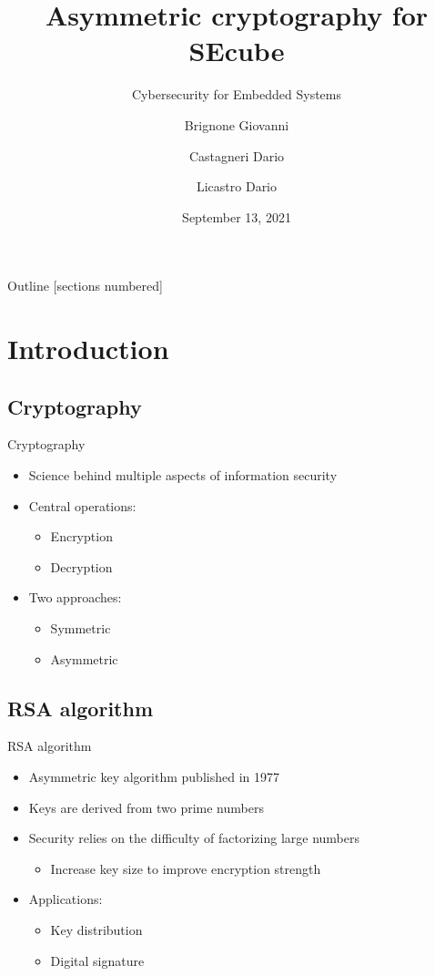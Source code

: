 \documentclass[aspectratio=169]{beamer}
\title{Asymmetric cryptography for SEcube}
\subtitle{Cybersecurity for Embedded Systems}
\author{Brignone Giovanni \and Castagneri Dario \and Licastro Dario}
\institute{Politecnico di Torino}
\date{September 13, 2021}
\begin{document}
\begin{frame}
	\maketitle
\end{frame}

\begin{frame}{Outline}
	[sections numbered]
	\tableofcontents[hideallsubsections]
\end{frame}

\section{Introduction}

\subsection{Cryptography}
\begin{frame}{Cryptography}
	\begin{itemize}
		\item Science behind multiple aspects of information security
		\item Central operations:
			\begin{itemize}
				\item Encryption
				\item Decryption
			\end{itemize}        
		\item Two approaches:
			\begin{itemize}
				\item Symmetric
				\item Asymmetric
			\end{itemize}
	\end{itemize}
\end{frame}

\subsection{RSA algorithm}
\begin{frame}{RSA algorithm}
	\begin{itemize}
		\item Asymmetric key algorithm published in 1977
		\item Keys are derived from two prime numbers
		\item Security relies on the difficulty of factorizing large
			numbers
			\begin{itemize}
				\item Increase key size to improve encryption
					strength
			\end{itemize}
		\item Applications:
			\begin{itemize}
				\item Key distribution
				\item Digital signature
			\end{itemize}
	\end{itemize}
\end{frame}
\end{document}
